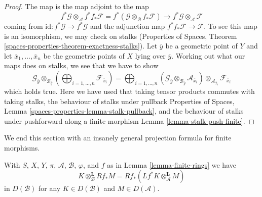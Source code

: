 \begin{proof}
The map is the map adjoint to the map
$$
f^*\mathcal{G} \otimes_\mathcal{A}
f^* f_*\mathcal{F} =
f^*(\mathcal{G} \otimes_\mathcal{B} f_*\mathcal{F})
\longrightarrow
f^*\mathcal{G} \otimes_\mathcal{A} \mathcal{F}
$$
coming from $\text{id} : f^*\mathcal{G} \to f^*\mathcal{G}$
and the adjunction map $f^* f_*\mathcal{F} \to \mathcal{F}$.
To see this map is an isomorphism, we may check on stalks
(Properties of Spaces, Theorem
\ref{spaces-properties-theorem-exactness-stalks}).
Let $\overline{y}$ be a geometric point of $Y$ and
let $\overline{x}_1, \ldots, \overline{x}_n$ be the geometric
points of $X$ lying over $\overline{y}$.
Working out what our maps does on stalks, we see that we
have to show
$$
\mathcal{G}_{\overline{y}}
\otimes_{\mathcal{B}_{\overline{y}}}
\left(
\bigoplus\nolimits_{i = 1, \ldots, n} \mathcal{F}_{\overline{x}_i}
\right) =
\bigoplus\nolimits_{i = 1, \ldots, n}
(\mathcal{G}_{\overline{y}}
\otimes_{\mathcal{B}_{\overline{y}}}
\mathcal{A}_{\overline{x}_i}) \otimes_{\mathcal{A}_{\overline{x}_i}}
\mathcal{F}_{\overline{x}_i}
$$
which holds true. Here we have used that
taking tensor products commutes with taking stalks, the
behaviour of stalks under pullback
Properties of Spaces, Lemma \ref{spaces-properties-lemma-stalk-pullback}, and
the behaviour of stalks under pushforward along a finite morphism
Lemma \ref{lemma-stalk-push-finite}.
\end{proof}

\noindent
We end this section with an insanely general projection formula
for finite morphisms.

\begin{lemma}
\label{lemma-projection-formula-finite}
With $S$, $X$, $Y$, $\pi$, $\mathcal{A}$, $\mathcal{B}$, $\varphi$, and $f$
as in Lemma \ref{lemma-finite-rings} we have
$$
K \otimes_\mathcal{B}^\mathbf{L} Rf_*M =
Rf_*(Lf^*K \otimes_\mathcal{A}^\mathbf{L} M)
$$
in $D(\mathcal{B})$ for any $K \in D(\mathcal{B})$ and
$M \in D(\mathcal{A})$.
\end{lemma}

